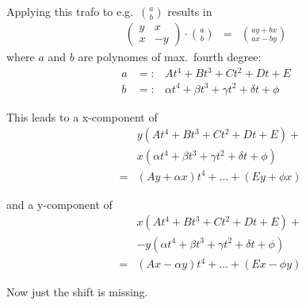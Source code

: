 Applying this trafo to e.g.\ ${a \choose b}$ results in
\begin{eqnarray}
\left(\begin{array}{cc}
 y &  x \\
 x & -y
\end{array}\right)
\cdot {a \choose b} &=&
{ay+bx \choose ax-by}
\end{eqnarray}
%
where $a$ and $b$ are polynomes of max.\ fourth degree:
%
\begin{eqnarray}
a &=:& At^4 + Bt^3 + Ct^2 + Dt + E \\
b &=:& \alpha t^4 + \beta t^3 + \gamma t^2 + \delta t + \phi
\end{eqnarray}

This leads to a x-component of
\begin{eqnarray}
&& y ( At^4 + Bt^3 + Ct^2 + Dt + E ) + \nonumber \\
&& x ( \alpha t^4 + \beta t^3 + \gamma t^2 + \delta t + \phi ) \\
&=& (Ay + \alpha x)t^4 + \ldots + (Ey + \phi x)
\end{eqnarray}

and a y-component of
\begin{eqnarray}
&&  x ( At^4 + Bt^3 + Ct^2 + Dt + E ) + \nonumber \\
&& -y ( \alpha t^4 + \beta t^3 + \gamma t^2 + \delta t + \phi ) \\
&=& (Ax - \alpha y)t^4 + \ldots + (Ex - \phi y)
\end{eqnarray}

Now just the shift is missing.

\clearpage
